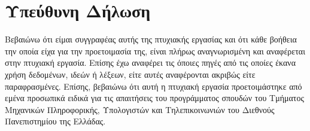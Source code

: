 \chapter*{Υπεύθυνη Δήλωση}

Βεβαιώνω ότι είμαι συγγραφέας αυτής της πτυχιακής εργασίας και ότι κάθε βοήθεια την οποία είχα για την προετοιμασία της,
είναι πλήρως αναγνωρισμένη και αναφέρεται στην πτυχιακή εργασία. Επίσης έχω αναφέρει τις όποιες πηγές από τις οποίες έκανα χρήση δεδομένων,
ιδεών ή λέξεων, είτε αυτές αναφέρονται ακριβώς είτε παραφρασμένες. Επίσης, βεβαιώνω ότι αυτή η πτυχιακή εργασία προετοιμάστηκε από εμένα
προσωπικά ειδικά για τις απαιτήσεις του προγράμματος σπουδών του Τμήματος Μηχανικών Πληροφορικής, Υπολογιστών και Τηλεπικοινωνιών
του Διεθνούς Πανεπιστημίου της Ελλάδας.
